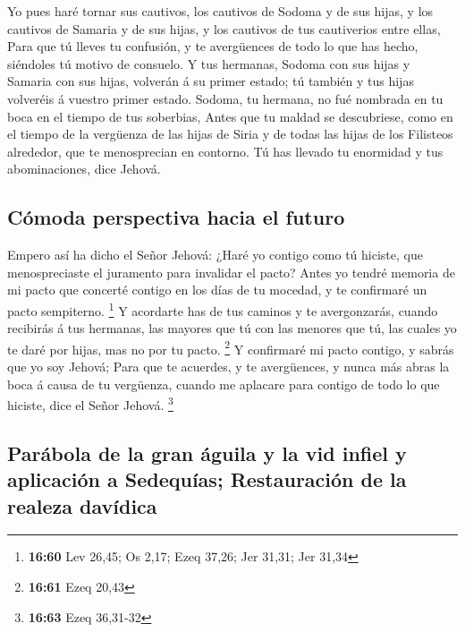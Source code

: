  Yo pues haré tornar sus cautivos, los cautivos de Sodoma y
de sus hijas, y los cautivos de Samaria y de sus hijas, y los cautivos
de tus cautiverios entre ellas,  Para que tú lleves tu
confusión, y te avergüences de todo lo que has hecho, siéndoles tú
motivo de consuelo.  Y tus hermanas, Sodoma con sus hijas y
Samaria con sus hijas, volverán á su primer estado; tú también y tus
hijas volveréis á vuestro primer estado.  Sodoma, tu
hermana, no fué nombrada en tu boca en el tiempo de tus soberbias,
 Antes que tu maldad se descubriese, como en el tiempo de
la vergüenza de las hijas de Siria y de todas las hijas de los Filisteos
alrededor, que te menosprecian en contorno.  Tú has llevado
tu enormidad y tus abominaciones, dice Jehová.

\hypertarget{cuxf3moda-perspectiva-hacia-el-futuro}{%
\subsection{Cómoda perspectiva hacia el
futuro}\label{cuxf3moda-perspectiva-hacia-el-futuro}}

 Empero así ha dicho el Señor Jehová: ¿Haré yo contigo como
tú hiciste, que menospreciaste el juramento para invalidar el pacto?
 Antes yo tendré memoria de mi pacto que concerté contigo
en los días de tu mocedad, y te confirmaré un pacto sempiterno.
\footnote{\textbf{16:60} Lev 26,45; Os 2,17; Ezeq 37,26; Jer 31,31; Jer
  31,34}  Y acordarte has de tus caminos y te avergonzarás,
cuando recibirás á tus hermanas, las mayores que tú con las menores que
tú, las cuales yo te daré por hijas, mas no por tu pacto. \footnote{\textbf{16:61}
  Ezeq 20,43}  Y confirmaré mi pacto contigo, y sabrás que
yo soy Jehová;  Para que te acuerdes, y te avergüences, y
nunca más abras la boca á causa de tu vergüenza, cuando me aplacare para
contigo de todo lo que hiciste, dice el Señor Jehová. \footnote{\textbf{16:63}
  Ezeq 36,31-32}

\hypertarget{paruxe1bola-de-la-gran-uxe1guila-y-la-vid-infiel-y-aplicaciuxf3n-a-sedequuxedas-restauraciuxf3n-de-la-realeza-davuxeddica}{%
\subsection{Parábola de la gran águila y la vid infiel y aplicación a
Sedequías; Restauración de la realeza
davídica}\label{paruxe1bola-de-la-gran-uxe1guila-y-la-vid-infiel-y-aplicaciuxf3n-a-sedequuxedas-restauraciuxf3n-de-la-realeza-davuxeddica}}

